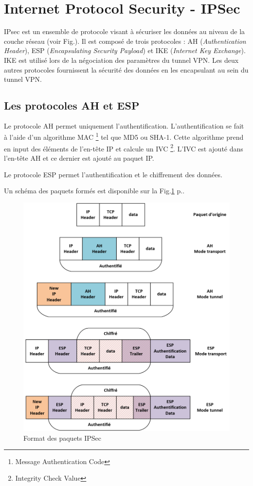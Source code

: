\section{Internet Protocol Security - IPSec}
IPsec est un ensemble de protocole visant à sécuriser les données au niveau de la couche réseau (voir Fig.). 
Il est composé de trois protocoles : AH (\textit{Authentication Header}), ESP (\textit{Encapsulating Security Payload}) et IKE (\textit{Internet Key Exchange}).
IKE est utilisé lors de la négociation des paramètres du tunnel VPN. 
Les deux autres protocoles fournissent la sécurité des données en les encapsulant au sein du tunnel VPN. 

\subsection{Les protocoles AH et ESP}
Le protocole AH permet uniquement l'authentification. 
L'authentification se fait à l'aide d'un algorithme MAC \footnote{Message Authentication Code} tel que MD5 ou SHA-1.
Cette algorithme prend en input des éléments de l'en-tête IP et calcule un IVC \footnote{Integrity Check Value}.
L'IVC est ajouté dans l'en-tête AH et ce dernier est ajouté au paquet IP.

Le protocole ESP permet l'authentification et le chiffrement des données.

Un schéma des paquets formés est disponible sur la Fig.\ref{fig:ipsecHead} p.\pageref{fig:ipsecHead}.

\begin{figure}
	\centering
	\includegraphics[width=16cm]{techno/IPSec-AH-ESP}
	\caption{Format des paquets IPSec}
	\label{fig:ipsecHead}
\end{figure}

